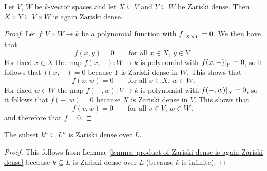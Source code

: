 \begin{lemma}
  \label{lemma: product of Zariski dense is again Zariski dense}
  Let $V$, $W$ be $k$-vector spaces and let $X \subseteq V$ and $Y \subseteq W$ be Zariski dense.
  Then $X \times Y \subseteq V \times W$ is again Zariski dense.
\end{lemma}


\begin{proof}
  Let $f \colon V \times W \to k$ be a polynomial function with $\restrict{f}{X \times Y} = 0$.
  We then have that
  \[
      f(x,y)
    = 0
    \qquad
    \text{for all $x \in X$, $y \in Y$} \,.
  \]
  For fixed $x \in X$ the map $f(x,-) \colon W \to k$ is polynomial with $\restrict{f(x,-)}{Y} = 0$, so it follows that $f(x,-) = 0$ because $Y$ is Zariski dense in $W$.
  This shows that
  \[
      f(x,w)
    = 0
    \qquad
    \text{for all $x \in X$, $w \in W$}.
  \]
  For fixed $w \in W$ the map $f(-,w) \colon V \to k$ is polynomial with $\restrict{f(-,w)}{X} = 0$, so it follows that $f(-,w) = 0$ because $X$ is Zariski dense in $V$.
  This shows that
  \[
      f(v,w)
    = 0
    \qquad
    \text{for all $v \in V$, $w \in W$} \,,
  \]
  and therefore that $f = 0$.
\end{proof}


\begin{corollary}
  \label{corollary: kn is Zariski dense in Ln}
  The subset $k^n \subseteq L^n$ is Zariski dense over $L$.
\end{corollary}


\begin{proof}
  This follows from Lemma~\ref{lemma: product of Zariski dense is again Zariski dense} because $k \subseteq L$ is Zariski dense over $L$ (because $k$ is infinite).
\end{proof}




